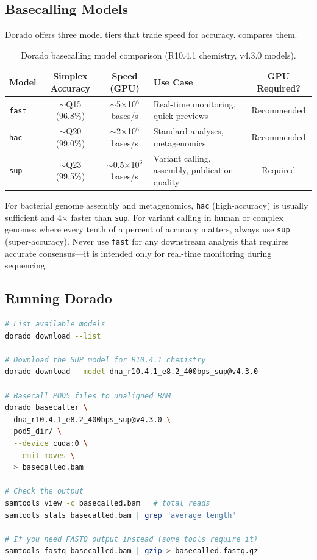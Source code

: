 \subsection{Basecalling Models}
\label{subsec:diyanalysis:models}

Dorado offers three model tiers that trade speed for accuracy.  compares them.

\begin{table}[htbp]
\centering
\caption{Dorado basecalling model comparison (R10.4.1 chemistry, v4.3.0 models).}
\label{tab:diy_models}
\begin{tabularx}{\textwidth}{@{}lccXc@{}}
\toprule
\textbf{Model} & \textbf{Simplex Accuracy} & \textbf{Speed (GPU)} & \textbf{Use Case} & \textbf{GPU Required?} \\
\midrule
\texttt{fast} & $\sim$Q15 (96.8\%) & $\sim$5$\times$10$^6$ bases/s & Real-time monitoring, quick previews & Recommended \\
\texttt{hac} & $\sim$Q20 (99.0\%) & $\sim$2$\times$10$^6$ bases/s & Standard analyses, metagenomics & Recommended \\
\texttt{sup} & $\sim$Q23 (99.5\%) & $\sim$0.5$\times$10$^6$ bases/s & Variant calling, assembly, publication-quality & Required \\
\bottomrule
\end{tabularx}
\end{table}

\begin{keyconcept}[title={Which Model Should I Use?}]
For bacterial genome assembly and metagenomics, \texttt{hac} (high-accuracy) is usually sufficient and 4$\times$ faster than \texttt{sup}. For variant calling in human or complex genomes where every tenth of a percent of accuracy matters, always use \texttt{sup} (super-accuracy). Never use \texttt{fast} for any downstream analysis that requires accurate consensus---it is intended only for real-time monitoring during sequencing.
\end{keyconcept}

\subsection{Running Dorado}
\label{subsec:diyanalysis:dorado_run}

\begin{lstlisting}[language=bash,caption={Basecalling with Dorado.},label=lst:diy-dorado]
# List available models
dorado download --list

# Download the SUP model for R10.4.1 chemistry
dorado download --model dna_r10.4.1_e8.2_400bps_sup@v4.3.0

# Basecall POD5 files to unaligned BAM
dorado basecaller \
  dna_r10.4.1_e8.2_400bps_sup@v4.3.0 \
  pod5_dir/ \
  --device cuda:0 \
  --emit-moves \
  > basecalled.bam

# Check the output
samtools view -c basecalled.bam   # total reads
samtools stats basecalled.bam | grep "average length"

# If you need FASTQ output instead (some tools require it)
samtools fastq basecalled.bam | gzip > basecalled.fastq.gz
\end{lstlisting}

